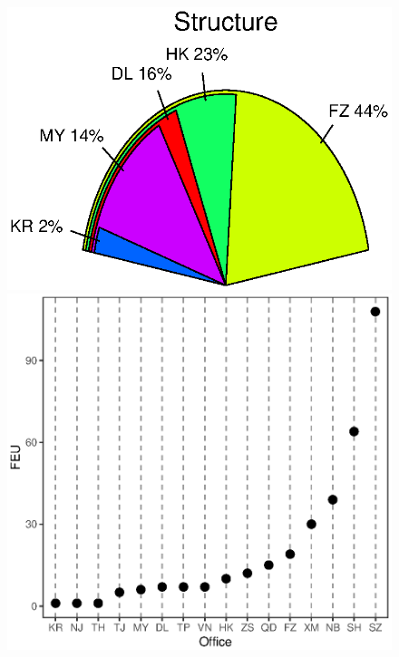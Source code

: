 \begin{figure}[ht]
\begin{center}
		\includegraphics[scale=0.4]{eps/Rplot09}
		\qquad
		\includegraphics[scale=0.4]{eps/Rplot13} \\
	\end{center}
\end{figure}
